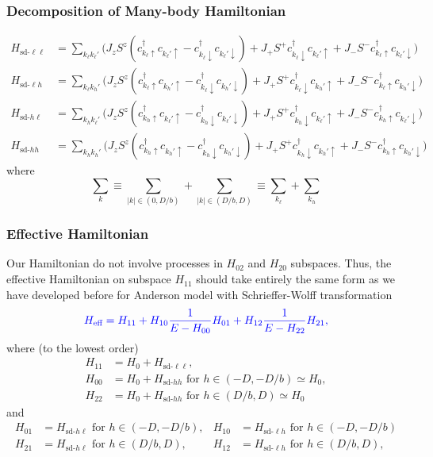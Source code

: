 \documentclass[10pt,aspectratio=43,xcolor=x11names]{beamer}%
\begin{document}
		\begin{frame}\frametitle{Decomposition of Many-body Hamiltonian}
			\begin{align*}
				H_{\text{sd-}\ell\ell}&=\sum_{k_\ell k_\ell'}\bigg(J_zS^z(c_{k_\ell\uparrow}^\dagger c_{k_\ell'\uparrow}-c_{k_\ell\downarrow}^\dagger c_{k_\ell'\downarrow})+J_+S^+c_{k_\ell\downarrow}^\dagger c_{k_\ell'\uparrow}+J_-S^-c_{k_\ell\uparrow}^\dagger c_{k_\ell'\downarrow}\bigg)\\
				H_{\text{sd-}\ell h}&=\sum_{k_\ell k_h'}\bigg(J_zS^z(c_{k_\ell\uparrow}^\dagger c_{k_h'\uparrow}-c_{k_\ell\downarrow}^\dagger c_{k_h'\downarrow})+J_+S^+c_{k_\ell\downarrow}^\dagger c_{k_h'\uparrow}+J_-S^-c_{k_\ell\uparrow}^\dagger c_{k_h'\downarrow}\bigg)\\
				H_{\text{sd-}h \ell}&=\sum_{k_h k_\ell'}\bigg(J_zS^z(c_{k_h\uparrow}^\dagger c_{k_\ell'\uparrow}-c_{k_h\downarrow}^\dagger c_{k_\ell'\downarrow})+J_+S^+c_{k_h\downarrow}^\dagger c_{k_\ell'\uparrow}+J_-S^-c_{k_h\uparrow}^\dagger c_{k_\ell'\downarrow}\bigg)\\
				H_{\text{sd-}h h}&=\sum_{k_h k_h'}\bigg(J_zS^z(c_{k_h\uparrow}^\dagger c_{k_h'\uparrow}-c_{k_h\downarrow}^\dagger c_{k_h'\downarrow})+J_+S^+c_{k_h\downarrow}^\dagger c_{k_h'\uparrow}+J_-S^-c_{k_h\uparrow}^\dagger c_{k_h'\downarrow}\bigg)
			\end{align*}
			where 
			\begin{equation*}
				\sum_k\equiv\sum_{|k|\in(0,D/b)}+\sum_{|k|\in(D/b,D)}\equiv\sum_{k_\ell}+\sum_{k_h}
			\end{equation*}
		\end{frame}
		\begin{frame}\frametitle{Effective Hamiltonian}
			Our Hamiltonian do not involve processes in $H_{02}$ and $H_{20}$ subspaces. Thus, the effective Hamiltonian on subspace $H_{11}$ should take entirely the same form as we have developed before for Anderson model with Schrieffer-Wolff transformation
			\begin{equation*}
				\color{blue}H_{\text{eff}}=H_{11}+H_{10}\dfrac{1}{E-H_{00}}H_{01}+H_{12}\dfrac{1}{E-H_{22}}H_{21},
			\end{equation*}
			where (to the lowest order)
			\begin{align*}
				H_{11}&=H_0+H_{\text{sd-}\ell\ell},\\
				H_{00}&=H_0+H_{\text{sd-}hh}\text{ for }h\in(-D,-D/b)\simeq H_0,\\
				H_{22}&=H_0+H_{\text{sd-}hh}\text{ for }h\in(D/b,D)\simeq H_0
			\end{align*}
			and
			\begin{align*}
				H_{01}&=H_{\text{sd-}h\ell}\text{ for }h\in(-D,-D/b), &H_{10}&=H_{\text{sd-}\ell h}\text{ for }h\in(-D,-D/b)\\
				H_{21}&=H_{\text{sd-}h\ell}\text{ for }h\in(D/b,D), &H_{12}&=H_{\text{sd-}\ell h}\text{ for }h\in(D/b,D),
			\end{align*}
		\end{frame}
\end{document}
